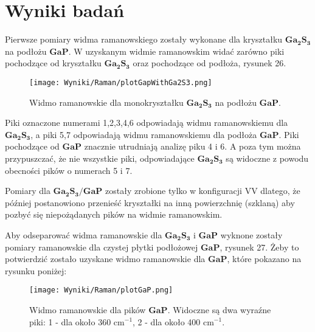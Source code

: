 \newpage

\section{Wyniki badań}

Pierwsze pomiary widma ramanowskiego zostały wykonane dla kryształku $\mathbf{Ga_2S_3}$ na podłożu $\mathbf{GaP}$. W uzyskanym widmie ramanowskim widać zarówno piki pochodzące od kryształku $\mathbf{Ga_2S_3}$ oraz pochodzące od podłoża, rysunek 26.

\begin{figure}[H]
	\begin{center}
		\texttt{[image: Wyniki/Raman/plotGapWithGa2S3.png]}
		\caption{Widmo ramanowskie dla monokryształku  $\mathbf{Ga_{2}S_{3}}$ na podłożu $\mathbf{GaP}.$}
	\end{center}
\end{figure}

Piki oznaczone numerami 1,2,3,4,6 odpowiadają widmu ramanowskiemu dla $\mathbf{Ga_{2}S_{3}}$, a piki 5,7 odpowiadają widmu ramanowskiemu dla podłoża $\mathbf{GaP}$. Piki pochodzące od $\mathbf{GaP}$ znacznie utrudniają analizę piku 4 i 6. A poza tym można przypuszczać, że nie wszystkie piki, odpowiadające $\mathbf{Ga_{2}S_{3}}$ są widoczne z powodu obecności pików o numerach 5 i 7. 

Pomiary dla $\mathbf{Ga_{2}S_{3}/GaP}$ zostały zrobione tylko w konfiguracji VV dlatego, że później postanowiono przenieść kryształki na inną powierzchnię (szklaną) aby pozbyć się niepożądanych pików na widmie ramanowskim. 

Aby odseparować widma ramanowskie dla $\mathbf{Ga_{2}S_{3}}$ i $\mathbf{GaP}$ wyknone zostały pomiary ramanowskie dla czystej płytki podłożowej $\mathbf{GaP}$, rysunek 27. Żeby to potwierdzić zostało uzyskane widmo ramanowskie dla $\mathbf{GaP}$, które pokazano na rysunku poniżej:

\begin{figure}[H]
	\begin{center}
		\texttt{[image: Wyniki/Raman/plotGaP.png]}
		\caption{Widmo ramanowskie dla pików $\mathbf{GaP}$. Widoczne są dwa wyraźne piki: 1 - dla około 360 cm$^{-1}$, 2 - dla około 400 cm$^{-1}$.}
	\end{center}
\end{figure}

